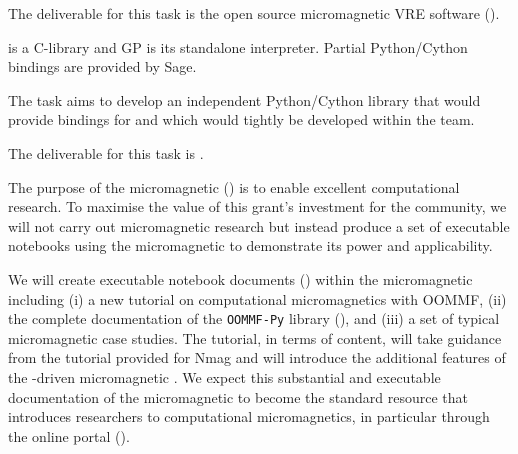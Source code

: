 \begin{workpackage}
\begin{tasklist}
\begin{task}[lead=USO,title=Case study: micromagnetic VRE built from
  \TheProject,id=oommf-py-ipython-attributes,PM=6,partners={SR,USH},wphases=9-15]
  The deliverable for this task is the open source micromagnetic VRE
  software ().
\end{task}

\begin{task}[lead=UB,title=Python/Cython bindings for Pari,PM=16,id=pari-python,wphases=0-24]

  \Pari is a C-library and GP is its standalone interpreter. Partial
  Python/Cython bindings are provided by Sage.

  The task aims to develop an independent Python/Cython library that
  would provide bindings for \PariGP and which would tightly be
  developed within the \PariGP team.

  The deliverable for this task is .
\end{task}

\begin{task}[lead=USO,title=Demonstrator: micromagnetic VRE notebooks,
  id=oommf-tutorial-and-documentation,PM=6,partners={SR,PS},wphases=15-21]

  The purpose of the micromagnetic \VRE
  () is to enable excellent
  computational research. To maximise the value of this grant's
  investment for the community, we will not carry out micromagnetic
  research but instead produce a set of executable notebooks using the
  micromagnetic \VRE to demonstrate its power and applicability.

  We will create executable notebook documents
  () within the micromagnetic \VRE
  including (i) a new tutorial on computational micromagnetics with
  OOMMF, (ii) the complete documentation of the \texttt{OOMMF-Py}
  library (),
  and (iii) a set of typical micromagnetic case studies. The tutorial,
  in terms of content, will take guidance from the tutorial provided
  for Nmag \cite{Nmag-tutorial-url} and will introduce the additional
  features of the \Jupyter-driven micromagnetic \VRE. We expect this
  substantial and executable documentation of the micromagnetic \VRE to
  become the standard resource that introduces researchers to
  computational micromagnetics, in particular through the online
  portal ().


\end{task}
\end{tasklist}
\end{workpackage}
